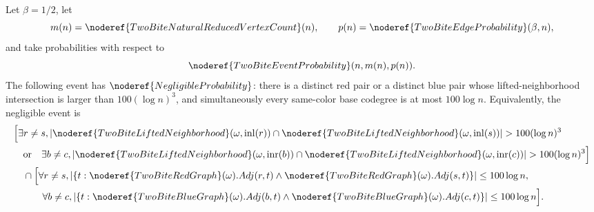 \begin{helper}[FiberAndDegreeSameColorLiftedIntersectionNegligible]
\label{helper:FiberAndDegreeSameColorLiftedIntersectionNegligible}
Let \(\beta=1/2\), let
\[
m(n)=\noderef{TwoBiteNaturalReducedVertexCount}(n),
\qquad
p(n)=\noderef{TwoBiteEdgeProbability}(\beta,n),
\]
and take probabilities with respect to
\[
\noderef{TwoBiteEventProbability}(n,m(n),p(n)).
\]
The following event has \(\noderef{NegligibleProbability}\): there is a
distinct red pair or a distinct blue pair whose lifted-neighborhood
intersection is larger than \(100(\log n)^3\), and simultaneously every
same-color base codegree is at most \(100\log n\).  Equivalently, the
negligible event is
\[
\begin{aligned}
&\Bigl[
\exists r\ne s,
\left|
\noderef{TwoBiteLiftedNeighborhood}(\omega,\operatorname{inl}(r))
\cap
\noderef{TwoBiteLiftedNeighborhood}(\omega,\operatorname{inl}(s))
\right|>100(\log n)^3\\
&\quad\text{or}\quad
\exists b\ne c,
\left|
\noderef{TwoBiteLiftedNeighborhood}(\omega,\operatorname{inr}(b))
\cap
\noderef{TwoBiteLiftedNeighborhood}(\omega,\operatorname{inr}(c))
\right|>100(\log n)^3
\Bigr]\\
&\quad\cap
\Bigl[
\forall r\ne s,
|\{t:\noderef{TwoBiteRedGraph}(\omega).Adj(r,t)\land
\noderef{TwoBiteRedGraph}(\omega).Adj(s,t)\}|\le100\log n,\\
&\qquad\quad
\forall b\ne c,
|\{t:\noderef{TwoBiteBlueGraph}(\omega).Adj(b,t)\land
\noderef{TwoBiteBlueGraph}(\omega).Adj(c,t)\}|\le100\log n
\Bigr].
\end{aligned}
\]
\end{helper}

